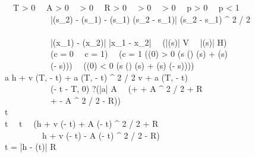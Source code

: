 \begin{figure}[p]
\begin{center}
\begin{sllisting}
\Init \Equiv \catm {} \, \land \, T > 0 \, \land \, A > 0 \, \land \, \caAint > 0 \, \land \, R > 0 \, \land \, \caSigmaOne > 0 \, \land \, \caSigmaTwo > 0 \, \land \, p > 0 \, \land \, p < 1 \, \land \, \\
  \slind \, \, \, \, \, \, \, \, \, \, \,   |\cahint(s_2) - \cahint(s_1) - \cavint(s_1) \cdot (s_2 - s_1)| \le \caAint (s_2 - s_1) ^ 2 / 2 \, \land \, \\
  \slind \, \, \, \, \, \, \, \, \, \, \,   |\cavint(x_1) - \cavint(x_2)| \le \caAint |x_1 - x_2| \, \land \,  (|\cavint(s)| \le V \, \land \, |\cahint(s)| \le H) \, \land \, \\
  \slind \, \, \, \, \, \, \, \, \, \, \, (c = 0 \, \lor \, c = 1) \, \land \, (c = 1 \limply (\cahint(0) > 0 \limply {} (s \le \catm \limply \cahint(\catm) \ge \cahint(s) + \cavint(s) \cdot\\
  \slind \, \, \, \, \, \, \, \, \, \, \,  (\catm - s))) \, \land \, (\cahint(0) < 0 \limply {} (s \le \catm \limply \cahint(\catm) \le \cahint(s) + \cavint(s) \cdot (\catm - s))))\\
\Ctrl \Equiv a \dlassign * \seq \cahnext \dlassign h + v \min(T, \catm - t) + a \min(T, \catm - t) ^ 2 / 2 \seq \cavnext \dlassign v + a \min(T, \catm - t) \seq \\
  \slind \, \, \, \, \, \, \, \, \, \, \, \catleftnext \dlassign \max(\catm - t - T, 0) \seq ?(|a| \le A \, \land \, (\cahnext + \cavnext \catleftnext + A \catleftnext ^ 2 / 2 \ge \cahmintmax + R \, \lor \, \\
  \slind \, \, \, \, \, \, \, \, \, \, \, \cahnext + \cavnext \catleftnext - A \catleftnext ^ 2 / 2 \le \cahmintmin - R))\\
\Plant \Equiv \catinit \dlassign t \seq {}\\
\Inv \Equiv t  \, \land \, t \le \catm \, \land \, (h + v (\catm - t) + A (\catm - t) ^ 2 / 2 \ge \cahmintmax + R \, \lor \, \\
  \slind \, \, \, \, \, \, \, \, \, h + v (\catm - t) - A (\catm - t) ^ 2 / 2 \le \cahmintmin - R)\\
\Safe \Equiv t = \catm \limply |h - \cahint(t)| \ge R\\
\pbmonotonicity\\

\end{sllisting}
\end{center}
\end{figure}
